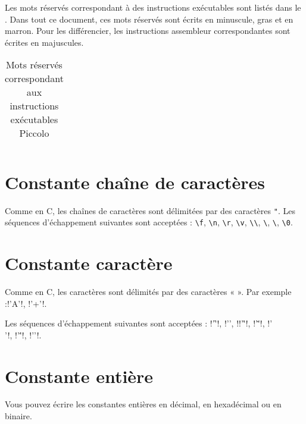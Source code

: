 

Les mots réservés correspondant à des instructions exécutables sont listés dans le . Dans tout ce document, ces mots réservés sont écrits en minuscule, gras et en marron. Pour les différencier, les instructions assembleur correspondantes sont écrites en majuscules.



\begin{table}[t]
  \centering
  \begin{tabular}{lllllll}
    
\end{tabular}
  \caption{Mots réservés correspondant aux instructions exécutables Piccolo}
  \ligne
\end{table}



\section{Constante chaîne de caractères}

Comme en C, les chaînes de caractères sont délimitées par des caractères \texttt{"}. Les séquences d’échappement suivantes sont acceptées : \texttt{\textbackslash f}, \texttt{\textbackslash n}, \texttt{\textbackslash r}, \texttt{\textbackslash v}, \texttt{\textbackslash\textbackslash}, \texttt{\textbackslash\textquotedbl}, \texttt{\textbackslash\textquotesingle}, \texttt{\textbackslash0}.

\section{Constante caractère}

Comme en C, les caractères sont délimités par des caractères « \texttt{\textquotesingle} ». Par exemple :\pic!'A'!, \pic!'+'!.


Les séquences d’échappement suivantes sont acceptées : \pic!'\f'!, \pic!'\n', !\pic!'\r'!, \pic!'\v'!, \pic!'\\'!, \pic!'\''!, \pic!'\0'!.

\section{Constante entière}

Vous pouvez écrire les constantes entières en décimal, en hexadécimal ou en binaire. 

